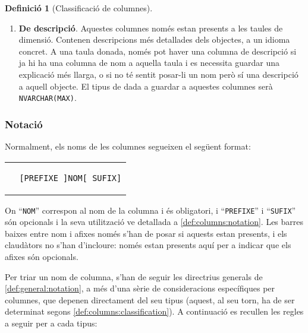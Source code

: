 \documentclass{article}
\theoremstyle{definition}
\newtheorem{definition}{Definició}
\begin{document}
\begin{definition}[Classificació de columnes]
\begin{enumerate}
    \item \textbf{De descripció}. Aquestes columnes només estan presents a les taules de dimensió. Contenen descripcions més detallades dels objectes, a un idioma concret. A una taula donada, només pot haver una columna de descripció si ja hi ha una columna de nom a aquella taula i es necessita guardar una explicació més llarga, o si no té sentit posar-li un nom però sí una descripció a aquell objecte. El tipus de dada a guardar a aquestes columnes serà \verb|NVARCHAR(MAX)|.
  \end{enumerate}
\end{definition}

\subsubsection{Notació}\label{section:nomenclature:columns:notation}

Normalment, els noms de les columnes segueixen el següent format:
\begin{center}
\begin{tabular}{c}
\begin{lstlisting}
  [PREFIXE_]NOM[_SUFIX]
\end{lstlisting}
\end{tabular}
\end{center}
On ``\verb|NOM|'' correspon al nom de la columna i és obligatori, i ``\verb|PREFIXE|'' i ``\verb|SUFIX|'' són opcionals i la seva utilització ve detallada a \cref{def:columns:notation}. Les barres baixes entre nom i afixes només s'han de posar si aquests estan presents, i els claudàtors no s'han d'incloure: només estan presents aquí per a indicar que els afixes són opcionals.

Per triar un nom de columna, s'han de seguir les directrius generals de \cref{def:general:notation}, a més d'una sèrie de consideracions específiques per columnes, que depenen directament del seu tipus (aquest, al seu torn, ha de ser determinat segons \cref{def:columns:classification}). A continuació es recullen les regles a seguir per a cada tipus:
\end{document}
